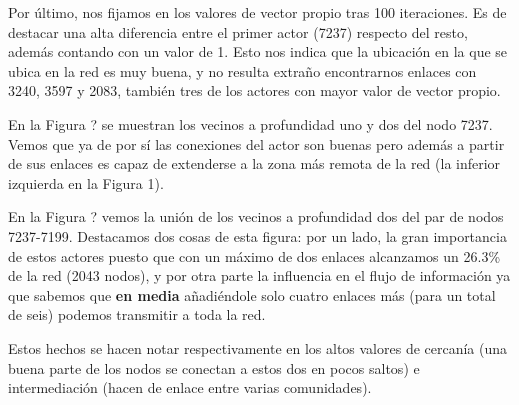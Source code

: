 \vspace{\baselineskip}

Por último, nos fijamos en los valores de vector propio tras 100 iteraciones. Es de destacar una alta diferencia entre el primer actor (7237) respecto del resto, además contando con un valor de 1. Esto nos indica que la ubicación en la que se ubica en la red es muy buena, y no resulta extraño encontrarnos enlaces con 3240, 3597 y 2083, también tres de los actores con mayor valor de vector propio.

En la Figura ? se muestran los vecinos a profundidad uno y dos del nodo 7237. Vemos que ya de por sí las conexiones del actor son buenas pero además a partir de sus enlaces es capaz de extenderse a la zona más remota de la red (la inferior izquierda en la Figura 1).

\vspace{\baselineskip}

En la Figura ? vemos la unión de los vecinos a profundidad dos del par de nodos 7237-7199. Destacamos dos cosas de esta figura: por un lado, la gran importancia de estos actores puesto que con un máximo de dos enlaces alcanzamos un 26.3\% de la red (2043 nodos), y por otra parte la influencia en el flujo de información ya que sabemos que \textbf{en media} añadiéndole solo cuatro enlaces más (para un total de seis) podemos transmitir a toda la red.

Estos hechos se hacen notar respectivamente en los altos valores de cercanía (una buena parte de los nodos se conectan a estos dos en pocos saltos) e intermediación (hacen de enlace entre varias comunidades). 